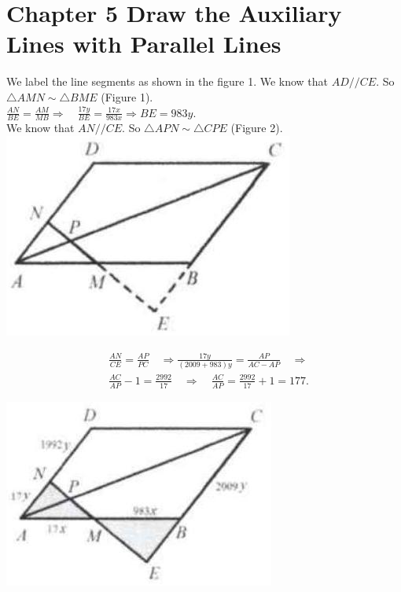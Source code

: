 \documentclass[10pt]{article}
\begin{document}
\section*{Chapter 5 Draw the Auxiliary Lines with Parallel Lines}
We label the line segments as shown in the figure 1. We know that \(A D / / C E\). So \(\triangle A M N \sim \triangle B M E\) (Figure 1).\\
\(\frac{A N}{B E}=\frac{A M}{M B} \Rightarrow \quad \frac{17 y}{B E}=\frac{17 x}{983 x} \Rightarrow B E=983 y\).\\
We know that \(A N / / C E\). So \(\triangle A P N \sim \triangle C P E\) (Figure 2).\\
\includegraphics[max width=\textwidth, center]{2025_04_17_97bc1f7e44d93c271a88g-142(2)}

\[
\begin{aligned}
& \frac{A N}{C E}=\frac{A P}{P C} \quad \Rightarrow \frac{17 y}{(2009+983) y}=\frac{A P}{A C-A P} \quad \Rightarrow \\
& \frac{A C}{A P}-1=\frac{2992}{17} \quad \Rightarrow \quad \frac{A C}{A P}=\frac{2992}{17}+1=177 .
\end{aligned}
\]

\begin{center}
\includegraphics[max width=\textwidth]{2025_04_17_97bc1f7e44d93c271a88g-142(1)}
\end{center}
\end{document}
